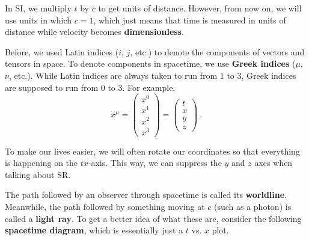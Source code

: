 \documentclass[11pt]{article}
\begin{document}
In SI, we multiply $t$ by $c$ to get units of distance. However, from now on, we will use units in which $c = 1$, which just means that time is measured in units of distance while velocity becomes \textbf{dimensionless}.

Before, we used Latin indices ($i$, $j$, etc.) to denote the components of vectors and tensors in space. To denote components in spacetime, we use \textbf{Greek indices} ($\mu$, $\nu$, etc.). While Latin indices are always taken to run from $1$ to $3$, Greek indices are supposed to run from $0$ to $3$. For example,
\begin{equation}
x^\mu = \begin{pmatrix}
x^0\\
x^1\\
x^2\\
x^3
\end{pmatrix} = \begin{pmatrix}
t\\
x\\
y\\
z
\end{pmatrix}\ .
\end{equation}

To make our lives easier, we will often rotate our coordinates so that everything is happening on the $tx$-axis. This way, we can suppress the $y$ and $z$ axes when talking about SR.

The path followed by an observer through spacetime is called its \textbf{worldline}. Meanwhile, the path followed by something moving at $c$ (such as a photon) is called a \textbf{light ray}. To get a better idea of what these are, consider the following \textbf{spacetime diagram}, which is essentially just a $t$ vs. $x$ plot.

\begin{figure}[H]    
\centering
{}
\caption{}
\end{figure}
\end{document}
